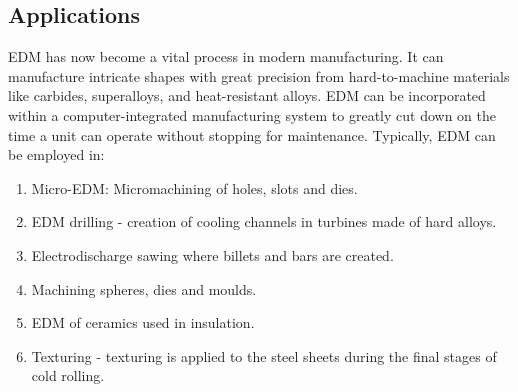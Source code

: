 \subsection{Applications}
EDM has now become a vital process in modern manufacturing. It can manufacture intricate shapes with great precision from hard-to-machine materials like carbides, superalloys, and heat-resistant alloys. EDM can be incorporated within a computer-integrated manufacturing system to greatly cut down on the time a unit can operate without stopping for maintenance. Typically, EDM can be employed in:
\begin{enumerate}
	\item Micro-EDM: Micromachining of holes, slots and dies.
	\item EDM drilling - creation of cooling channels in turbines made of hard alloys.
	\item Electrodischarge sawing where billets and bars are created.
	\item Machining spheres, dies and moulds.
	\item EDM of ceramics used in insulation.
	\item Texturing - texturing is applied to the steel sheets during the final stages of cold rolling.
\end{enumerate}
